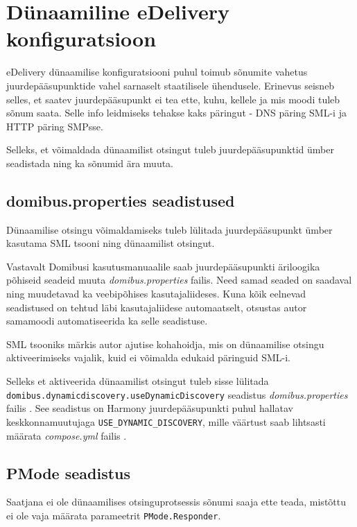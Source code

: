 \section{Dünaamiline eDelivery konfiguratsioon}

eDelivery dünaamilise konfiguratsiooni puhul toimub sõnumite vahetus juurdepääsupunktide vahel sarnaselt
staatilisele ühendusele. Erinevus seisneb selles, et saatev juurdepääsupunkt ei tea ette,
kuhu, kellele ja mis moodi tuleb sõnum saata. Selle info leidmiseks tehakse kaks päringut - 
DNS päring SML-i ja HTTP päring SMPsse.

Selleks, et võimaldada dünaamilist otsingut tuleb juurdepääsupunktid ümber seadistada ning ka sõnumid ära muuta.

\subsection{domibus.properties seadistused}

Dünaamilise otsingu võimaldamiseks tuleb lülitada juurdepääsupunkt ümber kasutama SML tsooni ning
dünaamilist otsingut. \cite[Peatükk 3.2.11 Domibus configuration for OASIS]{ec_domibus_docs_52}

Vastavalt Domibusi kasutusmanuaalile saab juurdepääsupunkti
äriloogika põhiseid seadeid muuta \textit{domibus.properties} failis. 
Need samad seaded on saadaval ning muudetavad ka veebipõhises kasutajaliideses. 
Kuna kõik eelnevad seadistused on tehtud läbi kasutajaliidese automaatselt, 
otsustas autor samamoodi automatiseerida ka selle seadistuse.

SML tsooniks märkis autor ajutise kohahoidja, mis on dünaamilise otsingu aktiveerimiseks vajalik, 
kuid ei võimalda edukaid päringuid SML-i.

Selleks et aktiveerida dünaamilist otsingut tuleb sisse lülitada
\texttt{domibus.\allowbreak{}dynamicdiscovery.\allowbreak{}useDynamicDiscovery} seadistus
\textit{domibus.properties} failis \cite[dynamic\_discovery\_configuration\_guide.md]{niis_harmony_common_repo}.
See seadistus on Harmony juurdepääsupunkti puhul hallatav keskkonnamuutujaga \texttt{USE\_DYNAMIC\_DISCOVERY},
mille väärtust saab lihtsasti määrata \textit{compose.yml} failis \cite{niis_harmony_ap_docker}.

\subsection{PMode seadistus}
Saatjana ei ole dünaamilises otsinguprotsessis sõnumi saaja ette teada, 
mistõttu ei ole vaja määrata parameetrit \texttt{PMode.Responder}.

